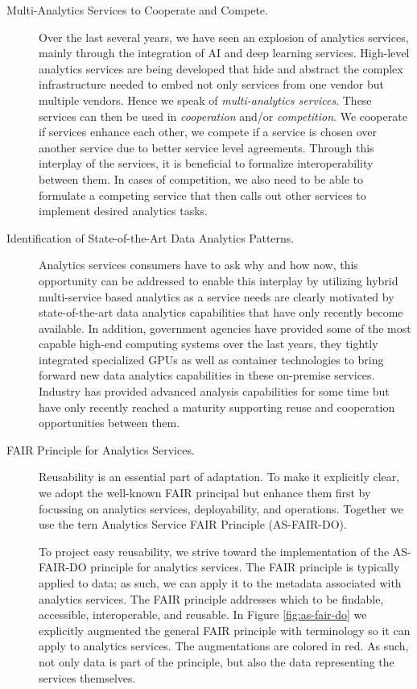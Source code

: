 \begin{description}
\item[Multi-Analytics Services to Cooperate and Compete.]

Over the last several years, we have seen an explosion of analytics
services, mainly through the integration of AI and deep learning
services. High-level analytics services are being developed that hide
and abstract the complex infrastructure needed to embed not only
services from one vendor but multiple vendors. Hence we speak of {\em
multi-analytics services}. These services can then be used in {\em
cooperation} and/or {\em competition}. We cooperate if services
enhance each other, we compete if a service is chosen over another
service due to better service level agreements. Through this interplay
of the services, it is beneficial to formalize interoperability
between them. In cases of competition, we also need to be able to
formulate a competing service that then calls out other services to
implement desired analytics tasks.

\item[Identification of State-of-the-Art Data Analytics Patterns.]

Analytics services consumers have to ask why and how now,
this opportunity can be addressed to enable this interplay by utilizing
hybrid multi-service based analytics as a service needs are clearly
motivated by state-of-the-art data analytics capabilities that have
only recently become available. In addition, government agencies have
provided some of the most capable high-end computing systems over the
last years, they tightly integrated specialized GPUs as well as
container technologies to bring forward new data analytics
capabilities in these on-premise services. Industry has provided
advanced analysis capabilities for some time but have only recently
reached a maturity supporting reuse and cooperation opportunities
between them.


\item[FAIR Principle for Analytics Services.]
\label{sec:fair}

Reusability is an essential part of adaptation. To make it explicitly
clear, we adopt the well-known FAIR principal \cite{??} but enhance
them first by focussing on analytics services, deployability, and
operations. Together we use the tern Analytics Service FAIR Principle
(AS-FAIR-DO).

To project easy reusability, we strive toward the implementation of
the AS-FAIR-DO principle for analytics services. The FAIR principle is
typically applied to data; as such, we can apply it to the metadata
associated with analytics services. The FAIR principle addresses which
to be findable, accessible, interoperable, and reusable. In
Figure \ref{fig:as-fair-do} we explicitly augmented the general FAIR
principle with terminology so it can apply to analytics services. The
augmentations are colored in red. As such, not only data is part of the
principle, but also the data representing the services themselves.

\end{description}

